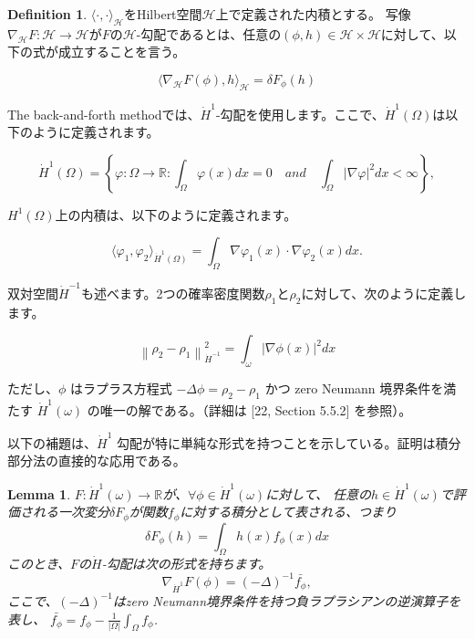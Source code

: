 \documentclass{jsarticle}
\newtheorem{lem}[thm]{Lemma}
\theoremstyle{definition}
\newtheorem{dfn}{Definition}[section]
\begin{document}
\begin{dfn}
  $\langle \cdot, \cdot \rangle_\mathcal{H}$をHilbert空間$\mathcal{H}$上で定義された内積とする。
  写像$\nabla_\mathcal{H} F: \mathcal{H} \to \mathcal{H} $が$F$の$\mathcal{H}$-勾配であるとは、任意の$(\phi, h) \in \mathcal{H} \times \mathcal{H}$に対して、以下の式が成立することを言う。

  \begin{equation*}
    \langle \nabla_\mathcal{H} F(\phi), h \rangle_\mathcal{H} = \delta F_\phi(h)
  \end{equation*}

\end{dfn}

The back-and-forth methodでは、$\dot{H}^1$-勾配を使用します。ここで、$\dot{H}^1(\Omega)$は以下のように定義されます。

\begin{equation}
\dot{H}^1(\Omega) = \left\{ \varphi: \Omega \rightarrow \mathbb{R} : \int_\Omega \varphi(x) dx = 0 \quad and \quad \int_{\Omega} |\nabla \varphi|^2 dx < \infty \right\},
\end{equation}


$H^1(\Omega)$上の内積は、以下のように定義されます。

\begin{equation*}
\langle \varphi_1, \varphi_2 \rangle_{\dot{H}^1(\Omega)} = \int_{\Omega} \nabla \varphi_1(x) \cdot \nabla \varphi_2(x) dx.
\end{equation*}

双対空間$\dot{H}^{-1}$も述べます。2つの確率密度関数$\rho_1$と$\rho_2$に対して、次のように定義します。

\begin{equation}
  \label{eq:H1metric}
  \left\lVert \rho_2 - \rho_1 \right\rVert_{\dot{H}^{-1}}^2 = \int_{\omega} |\nabla \phi(x)|^2 dx
\end{equation}
  
ただし、$\phi$ はラプラス方程式 $-\Delta \phi = \rho_2 - \rho_1$ かつ zero Neumann 境界条件を満たす $\dot{H}^1(\omega)$ の唯一の解である。（詳細は [22, Section 5.5.2] を参照）。

以下の補題は、$\dot{H}^1$ 勾配が特に単純な形式を持つことを示している。証明は積分部分法の直接的な応用である。

\begin{lem}
  $F: \dot{H}^1(\omega) \rightarrow \mathbb{R}$が、$\forall \phi \in \dot{H}^1(\omega)$に対して、
  任意の$h \in \dot{H}^1(\omega)$で評価される一次変分$\delta F_\phi$が関数$f_\phi$に対する積分として表される、つまり
  $$\delta F_\phi(h) = \int_{\Omega} h(x) f_\phi(x) dx$$
  このとき、$F$の$\dot{H}$-勾配は次の形式を持ちます。
  $$
  \nabla_{\dot{H}^1} F(\phi) = (- \Delta)^{-1} \bar{f_\phi},
  $$
  ここで、$(-\Delta)^{-1}$はzero Neumann境界条件を持つ負ラプラシアンの逆演算子を表し、
  $\bar{f_\phi} = f_\phi - \frac{1}{|\Omega|} \int_\Omega f_\phi$.
\end{lem}
\end{document}
